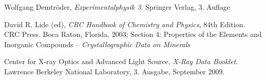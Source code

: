 \documentclass[10pt, a4paper]{article}
\begin{document}

\begin{thebibliography}{9}
	Wolfgang Demtröder,
	\emph{Experimentalphysik 3}.
	Springer Verlag,
	3. Auflage

  David R. Lide (ed),
  \emph{CRC Handbook of Chemistry and Physics},
  84th Edition. CRC Press. Boca Raton, Florida, 2003;
  Section 4: Properties of the Elements and Inorganic Compounds --
  \emph{Crystallographic Data on Minerals}

  Center for X-ray Optics and Advanced Light Source,
  \emph{X-Ray Data Booklet}.
  Lawrence Berkeley National Laboratory,
  3. Ausgabe,
  September 2009.
\end{thebibliography}

\newpage

\begin{appendix}

\end{appendix}
\end{document}
